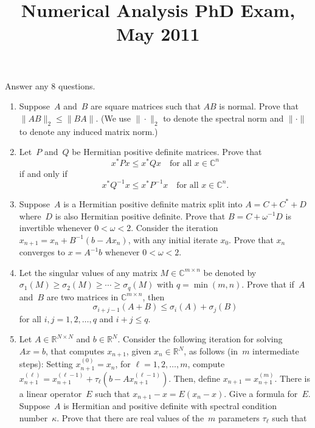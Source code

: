 \documentclass[11pt,letterpaper]{article}
\title{Numerical Analysis PhD Exam, May 2011}
\author{}
\date{}
\newenvironment{examproblems}[2]{%
  \def\ProblemHeadingTag{#2}%
  \AssignTaggingSocketPlug{block/list/label}{examproblem}%
  \begin{enumerate}%
  \setcounter{enumi}{#1}%
  \renewcommand{\labelenumi}{\textbf{\theenumi.}}%
  \setlength{\topsep}{0.35em}%
  \setlength{\partopsep}{0pt}%
  \setlength{\itemsep}{0.48em}%
  \setlength{\parsep}{0.18em}%
}{\end{enumerate}}
\newenvironment{examinstructions}{%
  \par\begingroup\itshape
}{%
  \par\endgroup\vspace{0.18em}
}
\begin{document}
\maketitle
\thispagestyle{empty}
\begin{examinstructions}
Answer any 8 questions.
\end{examinstructions}
\begin{examproblems}{0}{H2}
\def\ProblemHeadingText{Problem 1.}
\item
Suppose~\(A\) and~\(B\) are square matrices such that \(AB\) is normal. Prove that \(\|AB\|_2 \leq \|BA\|\). (We use \(\|\cdot\|_2\) to denote the spectral norm and \(\|\cdot\|\) to denote any induced matrix norm.)
\def\ProblemHeadingText{Problem 2.}
\item
Let~\(P\) and~\(Q\) be Hermitian positive definite matrices. Prove that
\[
x^*Px \leq x^*Qx \quad \text{for all } x \in \mathbb{C}^n
\]
 if and only if
\[
x^*Q^{-1}x \leq x^*P^{-1}x \quad \text{for all } x \in \mathbb{C}^n.
\]
\def\ProblemHeadingText{Problem 3.}
\item
Suppose~\(A\) is a Hermitian positive definite matrix split into \(A=C+C^*+D\) where~\(D\) is also Hermitian positive definite. Prove that \(B=C+\omega^{-1}D\) is invertible whenever \(0<\omega<2\). Consider the iteration \(x_{n+1}=x_n+B^{-1}(b-Ax_n)\), with any initial iterate \(x_0\). Prove that \(x_n\) converges to \(x=A^{-1}b\) whenever \(0<\omega<2\).
\def\ProblemHeadingText{Problem 4.}
\item
Let the singular values of any matrix \(M\in\mathbb{C}^{m\times n}\) be denoted by \(\sigma_1(M)\geq\sigma_2(M)\geq\cdots\geq\sigma_q(M)\) with \(q=\min(m,n)\). Prove that if~\(A\) and~\(B\) are two matrices in \(\mathbb{C}^{m\times n}\), then
\[
\sigma_{i+j-1}(A+B)\leq\sigma_i(A)+\sigma_j(B)
\]
 for all \(i,j=1,2,\ldots,q\) and \(i+j\leq q\).
\def\ProblemHeadingText{Problem 5.}
\item
Let \(A\in\mathbb{R}^{N\times N}\) and \(b\in\mathbb{R}^N\). Consider the following iteration for solving \(Ax=b\), that computes \(x_{n+1}\), given \(x_n\in\mathbb{R}^N\), as follows (in~\(m\) intermediate steps): Setting \(x_{n+1}^{(0)}=x_n\), for \(\ell=1,2,\ldots,m\), compute \(x_{n+1}^{(\ell)}=x_{n+1}^{(\ell-1)}+\tau_\ell(b-Ax_{n+1}^{(\ell-1)})\). Then, define \(x_{n+1}=x_{n+1}^{(m)}\). There is a linear operator~\(E\) such that \(x_{n+1}-x=E(x_n-x)\). Give a formula for~\(E\). Suppose~\(A\) is Hermitian and positive definite with spectral condition number~\(\kappa\). Prove that there are real values of the~\(m\) parameters \(\tau_\ell\) such that

\end{examproblems}
\end{document}
